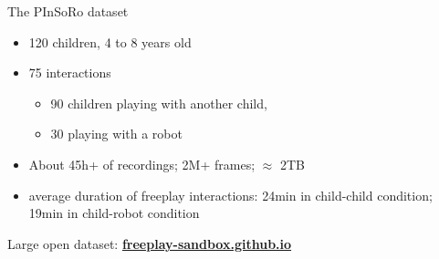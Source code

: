 \documentclass[compress]{beamer}
\begin{document}

{
\begin{frame}{The PInSoRo dataset}
    \begin{itemize}
        \item 120 children, 4 to 8 years old
        \item 75 interactions
            \begin{itemize}
                \item 90 children playing with another child, 
                \item 30 playing with a robot
            \end{itemize}
        \item About 45h+ of recordings; 2M+ frames; $\approx$ 2TB
         \item average duration of freeplay interactions: 24min in child-child
         condition; 19min in child-robot condition
    \end{itemize}

    \begin{center}
        Large open dataset: \href{https://freeplay-sandbox.github.io}{\bf freeplay-sandbox.github.io}
    \end{center}
\end{frame}
}

%
%
%




%
\end{document}

